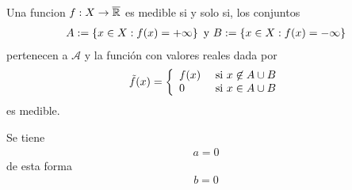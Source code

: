 \documentclass[../template.tex]{subfiles}
\begin{document}
    Una funcion $f: X \rightarrow \overline{ \mathbb{R} }$ es medible si y solo si, los conjuntos
        \begin{align}
            A := \left\lbrace x \in X : f(x) = + \infty \right\rbrace \text{ y } B := \left\lbrace x \in X : f(x) = - \infty \right\rbrace
        \end{align}
    pertenecen a $\mathcal{A}$ y la función con valores reales dada por
        \begin{align}
            \tilde{f}(x) = \left\{ 
                \begin{array}{ll} 
                    f(x) & \text{ si } x \not\in A \cup B \\ 
                    0 & \text{ si } x \in A \cup B 
                \end{array} \right.
        \end{align}
    es medible.
    
    \begin{demostracion}
        Se tiene
            \begin{align}
                a = 0
            \end{align}
        de esta forma
            \begin{align}
                b = 0
            \end{align}

    \end{demostracion}
\end{document}
